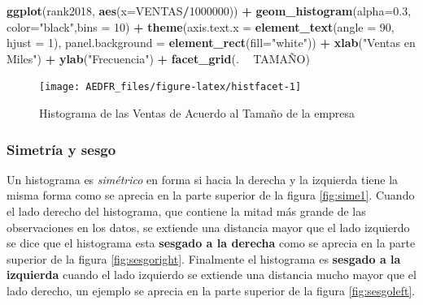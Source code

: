 \documentclass[letterpaper,]{book}
\newenvironment{Shaded}{\begin{snugshade}}{\end{snugshade}}
\newcommand{\DataTypeTok}[1]{\textcolor[rgb]{0.13,0.29,0.53}{#1}}
\newcommand{\DecValTok}[1]{\textcolor[rgb]{0.00,0.00,0.81}{#1}}
\newcommand{\FloatTok}[1]{\textcolor[rgb]{0.00,0.00,0.81}{#1}}
\newcommand{\KeywordTok}[1]{\textcolor[rgb]{0.13,0.29,0.53}{\textbf{#1}}}
\newcommand{\NormalTok}[1]{#1}
\newcommand{\OperatorTok}[1]{\textcolor[rgb]{0.81,0.36,0.00}{\textbf{#1}}}
\newcommand{\StringTok}[1]{\textcolor[rgb]{0.31,0.60,0.02}{#1}}
\begin{document}
\begin{Shaded}
\begin{Highlighting}[]
\KeywordTok{ggplot}\NormalTok{(rank2018, }\KeywordTok{aes}\NormalTok{(}\DataTypeTok{x=}\NormalTok{VENTAS}\OperatorTok{/}\DecValTok{1000000}\NormalTok{)) }\OperatorTok{+}\StringTok{ }
\StringTok{  }\KeywordTok{geom_histogram}\NormalTok{(}\DataTypeTok{alpha=}\FloatTok{0.3}\NormalTok{, }\DataTypeTok{color=}\StringTok{"black"}\NormalTok{,}\DataTypeTok{bins =} \DecValTok{10}\NormalTok{) }\OperatorTok{+}
\StringTok{  }\KeywordTok{theme}\NormalTok{(}\DataTypeTok{axis.text.x =} \KeywordTok{element_text}\NormalTok{(}\DataTypeTok{angle =} \DecValTok{90}\NormalTok{, }\DataTypeTok{hjust =} \DecValTok{1}\NormalTok{), }
        \DataTypeTok{panel.background =} \KeywordTok{element_rect}\NormalTok{(}\DataTypeTok{fill=}\StringTok{"white"}\NormalTok{)) }\OperatorTok{+}
\StringTok{  }\KeywordTok{xlab}\NormalTok{(}\StringTok{"Ventas en Miles"}\NormalTok{) }\OperatorTok{+}\StringTok{ }\KeywordTok{ylab}\NormalTok{(}\StringTok{"Frecuencia"}\NormalTok{) }\OperatorTok{+}
\StringTok{  }\KeywordTok{facet_grid}\NormalTok{(. }\OperatorTok{~}\StringTok{ }\NormalTok{TAMAÑO)}
\end{Highlighting}
\end{Shaded}

\begin{figure}[h!]

{\centering \texttt{[image: AEDFR\_files/figure-latex/histfacet-1]} 

}

\caption{Histograma de las Ventas de Acuerdo al Tamaño de la empresa}\label{fig:histfacet}
\end{figure}

\hypertarget{simetria-y-sesgo}{%
\subsubsection{Simetría y sesgo}\label{simetria-y-sesgo}}

Un histograma es \emph{simétrico} en forma si hacia la derecha y la izquierda tiene la misma forma como se aprecia en la parte superior de la figura \ref{fig:sime1}. Cuando el lado derecho del histograma, que contiene la mitad más grande de las observaciones en los datos, se extiende una distancia mayor que el lado izquierdo se dice que el histograma esta \textbf{sesgado a la derecha} como se aprecia en la parte superior de la figura \ref{fig:sesgoright}. Finalmente el histograma es \textbf{sesgado a la izquierda} cuando el lado izquierdo se extiende una distancia mucho mayor que el lado derecho, un ejemplo se aprecia en la parte superior de la figura \ref{fig:sesgoleft}.
\end{document}
